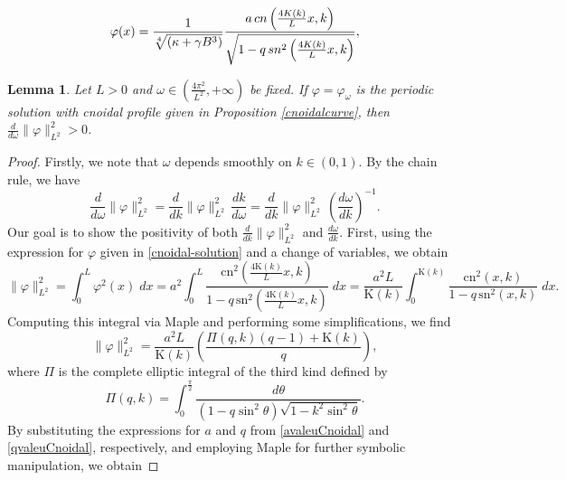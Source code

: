 \documentclass[10pt,a4paper]{amsart}
\newtheorem{lemma}{Lemma}
\begin{document}
	\begin{equation}
		\varphi(x) = \frac{1}{\sqrt[4]{(\kappa + \gamma B^3)}}\frac{ a \, {\rm cn}\left( \frac{4{\rm K}(k)}{L}x,k\right)}{\sqrt{ 1 - q \, {\rm sn}^2 \left( \frac{4 {\rm K}(k)}{L} x, k \right)}},
	\end{equation}

\begin{lemma}\label{dif-norma}
Let $L>0$ and $\omega \in \left( \frac{4\pi^2}{L^2}, +\infty \right)$ be fixed. {If  $\varphi=\varphi_\omega$ is the periodic solution with cnoidal profile given in Proposition \ref{cnoidalcurve}, then   $\frac{d}{d\omega} \|\varphi\|_{L^2}^2 > 0$.}
\end{lemma}

\begin{proof}
    Firstly, we note that $\omega$ depends smoothly on $k \in (0,1)$. By the chain rule, we have
    \begin{equation*}
        \frac{d}{d\omega} \|\varphi\|_{L^2}^2 = \frac{d}{dk} \|\varphi\|_{L^2}^2 \, \frac{dk}{d\omega} = \frac{d}{dk} \|\varphi\|_{L^2}^2 \, \left( \frac{d\omega}{dk}\right)^{-1}.
    \end{equation*}
    Our goal is to show the positivity of both $\frac{d}{dk} \|\varphi\|_{L^2}^2$ and $\frac{d\omega}{dk}$. First, using the expression for $\varphi$ given in \eqref{cnoidal-solution} and a change of variables, we obtain
    \begin{equation*}
        \|\varphi\|_{L^2}^2 = \int_0^L \varphi^2(x)\; dx = a^2 \int_0^L \frac{ \text{cn}^2 \left( \frac{4 \text{K}(k)}{L} x, k \right)}{ 1 - q \, \text{sn}^2 \left( \frac{4 \text{K}(k)}{L} x, k \right)} \; dx = \frac{a^2 L}{\text{K}(k)} \int_0^{\text{K}(k)} \frac{ \text{cn}^2(x,k)}{1-q \, \text{sn}^2(x,k)} \;dx.
    \end{equation*}
    Computing this integral via Maple and performing some simplifications, we find
    \begin{equation*}
        \|\varphi\|_{L^2}^2 = \frac{a^2 L}{\text{K}(k)} \left( \frac{\Pi(q,k) (q-1) + \text{K}(k)}{q} \right),
    \end{equation*}
    where $\Pi$ is the complete elliptic integral of the third kind defined by 
    \begin{equation*}
    \Pi(q, k) = \int_{0}^{\frac{\pi}{2}} \frac{d\theta}{(1 - q \sin^2 \theta) \sqrt{1 - k^2 \sin^2 \theta}}.
    \end{equation*}
    By substituting the expressions for $a$ and $q$ from \eqref{avaleuCnoidal} and \eqref{qvaleuCnoidal}, respectively, and employing Maple for further symbolic manipulation, we obtain

\end{proof}
\end{document}
